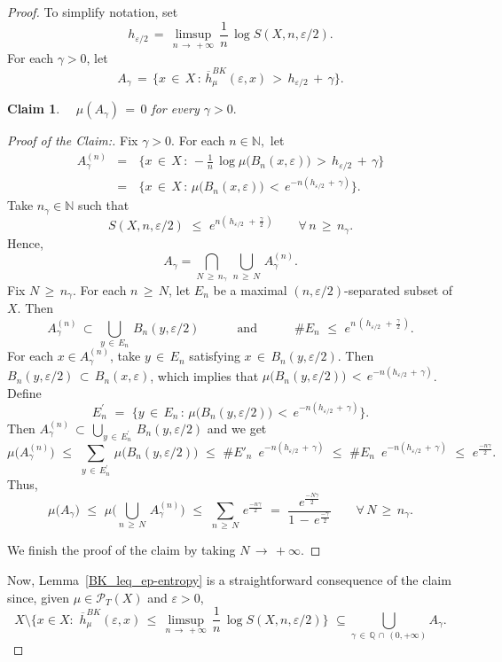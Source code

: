 \documentclass[10pt,a4paper]{amsart}
\newtheorem{claim}{Claim}
\newcommand{\NN}{\field{N}}
\newcommand{\cP}{{\mathcal P}}
\newcommand{\ep} {\varepsilon}
\newcommand{\field}[1]{\mathbb{#1}}
\newcommand{\ga} {\gamma}    \newcommand{\Ga}{\Gamma}
\newcommand{\vep}{\varepsilon}
\begin{document}
\begin{proof}
To simplify notation, set 
$$h_{\ep/2} \,=\,\limsup_{n\, \to \, +\infty}\, \frac{1}{n}\,\log S(X,n,\vep/2).$$
For each $\ga>0$, let $$A_\ga\,=\,\{x\,\in\,X\,\colon\, \overline{h}^{BK}_\mu(\ep,x) \,>\,h_{\ep/2}\,+\,\ga\}.$$
\medskip

\begin{claim} \emph{$\quad\mu(A_\ga)\,=\,0$ for every $\ga>0.$}
\end{claim}

\begin{proof}[Proof of the Claim:]
Fix $\ga>0$. For each $n\in\NN,$ let 
\begin{eqnarray*}
A_\ga^{(n)}&=&\,\big\{x\,\in\,X\,\colon\, -\frac{1}{n}\,\log\mu\big(B_n(x,\ep)\big) \,>\,h_{\ep/2}\,+\,\ga\big\} \\ &=&\,\big\{x\,\in\,X\,\colon\, \mu\big(B_n(x,\ep)\big) \,<\,e^{-n(h_{\ep/2}\,+\,\ga)}\big\}.
\end{eqnarray*}
Take $n_\ga\in\NN$ such that $$S(X,n,\vep/2)\,\,\leq\,\,e^{n(\,h_{\ep/2}\,\,+\,\frac{\ga}{2}\,)}\qquad\forall\, n\,\geq\, n_\ga.$$
Hence, 
$$A_\ga=\bigcap_{N\,\geq\,n_\ga} \,\bigcup_{n\,\geq\,N} \,A_\ga^{(n)}.$$ 
Fix $N\,\geq\,n_\ga$. For each $n\,\geq\,N$, let $E_n$ be a maximal $(n,\ep/2)$-separated subset of $X.$ Then $$A_\ga^{(n)}\,\subset\,\bigcup_{y\,\in\,E_n}\,B_n(y,\ep/2)\qquad\quad\text{and}\quad\qquad \#E_n\,\,\leq\,\,e^{n\,(\,h_{\ep/2}\,\,+\,\frac{\ga}{2}\,)}.$$ For each $x\in A_\ga^{(n)}$, take $
y\,\in\,E_n$ satisfying $x\,\in\,B_n(y,\ep/2)$. Then $B_n(y,\ep/2)\,\subset\,B_n(x,\ep)$, which implies that $\mu\big(B_n(y,\ep/2)\big)\,<\,e^{-n(h_{\ep/2}\,+\,\ga)}$. Define $$E^\prime_n\,\,=\,\,\Big\{y\,\in\,E_n\,\colon\,\mu\big(B_n(y,\ep/2)\big)\,<\,e^{-n(h_{\ep/2}\,+\,\ga)} \Big\}.$$ 
Then $A_\ga^{(n)}\,\subset\,\bigcup_{y\,\in\,E^\prime_n}\,B_n(y,\ep/2)$ and we get 
$$\mu\big( A_\ga^{(n)}\big)\,\,\leq\,\,\sum_{y\,\in\,E^\prime_n}\,\mu\big(B_n(y,\ep/2)\big)\,\,\leq\,\,\#E'_n\,\,\,e^{-n(h_{\ep/2}\,+\,\ga)}\,\,\leq\,\,\#E_n\,\,\,e^{-n(h_{\ep/2}\,+\,\ga)}\,\,\leq\,\,e^{\frac{-n\ga}{2}}.$$ 
Thus, 
$$\mu\big( A_\ga \big)\,\,\leq\,\,\mu\Big( \bigcup_{n\,\geq\,N} \,A_\ga^{(n)} \Big)\,\,\leq\,\,\sum_{n\,\geq\,N} \,e^{\frac{-n\ga}{2}}\,\,=\,\, \frac{e^{\frac{-N\ga}{2}}}{1\,-\,e^{\frac{-\ga}{2}}}\qquad\forall \,N\,\geq\,n_\ga.$$

\noindent We finish the proof of the claim by taking $N\,\to\,+\infty$.
\end{proof}

Now, Lemma~\ref{BK_leq_ep-entropy} is a straightforward consequence of the claim since, given  $\mu\in\cP_T(X)$ and $\ep>0$, 
$$X \setminus \Big\{x \in X \colon \,\,\overline{h}^{BK}_\mu(\ep,x) \,\leq\, \limsup_{n\, \to \, +\infty}\, \frac{1}{n}\,\log S(X,n,\vep/2)\Big\} \,\, \subseteq \bigcup_{\ga \,\in \,\mathbb{Q}\,\cap\,(0,+\infty)}  A_\ga.$$
\end{proof}
\end{document}
